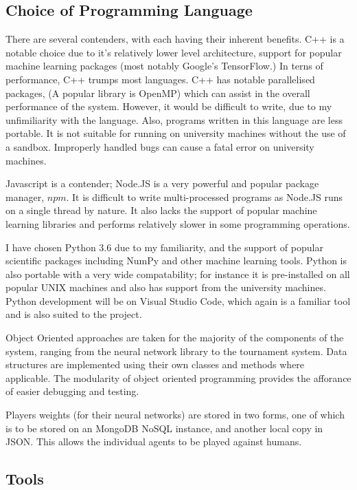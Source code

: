 \documentclass[12pt,a4paper]{article}
\begin{document}
\subsection*{Choice of Programming Language}

    There are several contenders, with each having their inherent benefits. C++ is a notable choice due to it's relatively lower level architecture, support for popular machine learning packages (most notably Google's TensorFlow.) In terns of performance, C++ trumps most languages. C++ has notable parallelised packages, (A popular library is OpenMP) which can assist in the overall performance of the system. However, it would be difficult to write, due to my unfimiliarity with the language. Also, programs written in this language are less portable. It is not suitable for running on university machines without the use of a sandbox. Improperly handled bugs can cause a fatal error on university machines.

    Javascript is a contender; Node.JS is a very powerful and popular package manager, $npm$. It is difficult to write multi-processed programs as Node.JS runs on a single thread by nature. It also lacks the support of popular machine learning libraries and performs relatively slower in some programming operations.

    I have chosen Python 3.6 due to my familiarity, and the support of popular scientific packages including NumPy and other machine learning tools. Python is also portable with a very wide compatability; for instance it is pre-installed on all popular UNIX machines and also has support from the university machines. Python development will be on Visual Studio Code, which again is a familiar tool and is also suited to the project.

    Object Oriented approaches are taken for the majority of the components of the system, ranging from the neural network library to the tournament system. Data structures are implemented using their own classes and methods where applicable. The modularity of object oriented programming provides the afforance of easier debugging and testing.

    Players weights (for their neural networks) are stored in two forms, one of which is to be stored on an MongoDB NoSQL instance, and another local copy in JSON. This allows the individual agents to be played against humans.

\subsection*{Tools}
\end{document}
